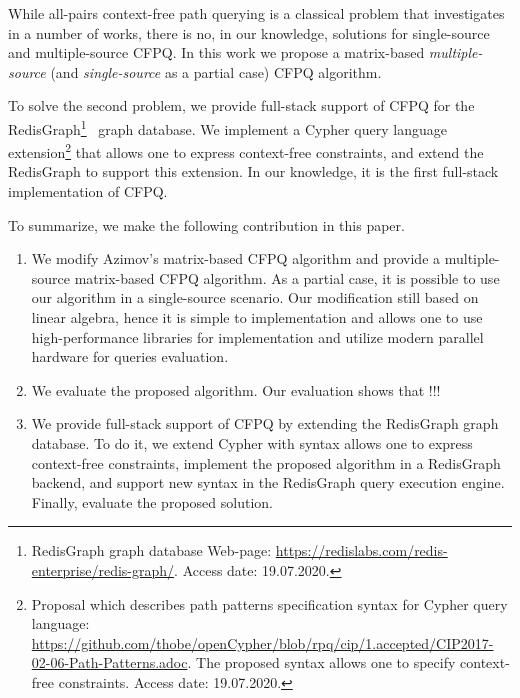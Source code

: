 While all-pairs context-free path querying is a classical problem that investigates in a number of works, there is no, in our knowledge, solutions for single-source and multiple-source CFPQ.
In this work we propose a matrix-based \textit{multiple-source} (and \textit{single-source} as a partial case) CFPQ algorithm.

To solve the second problem, we provide full-stack support of CFPQ for the RedisGraph\footnote{RedisGraph graph database Web-page: \url{https://redislabs.com/redis-enterprise/redis-graph/}. Access date: 19.07.2020.}~\cite{8778293} graph database.
We implement a Cypher query language extension\footnote{Proposal which describes path patterns specification syntax for Cypher query language: \url{https://github.com/thobe/openCypher/blob/rpq/cip/1.accepted/CIP2017-02-06-Path-Patterns.adoc}. The proposed syntax allows one to specify context-free constraints. Access date: 19.07.2020.} that allows one to express context-free constraints, and extend the RedisGraph to support this extension.
In our knowledge, it is the first full-stack implementation of CFPQ.

To summarize, we make the following contribution in this paper.
\begin{enumerate}
	\item We modify Azimov's matrix-based CFPQ algorithm and provide a multiple-source matrix-based CFPQ algorithm.
	As a partial case, it is possible to use our algorithm in a single-source scenario.
	Our modification still based on linear algebra, hence it is simple to implementation and allows one to use high-performance libraries for implementation and utilize modern parallel hardware for queries evaluation. 
	\item We evaluate the proposed algorithm.
	Our evaluation shows that !!!
	\item We provide full-stack support of CFPQ by extending the RedisGraph graph database.
	To do it, we extend Cypher with syntax allows one to express context-free constraints, implement the proposed algorithm in a RedisGraph backend, and support new syntax in the RedisGraph query execution engine. Finally, evaluate the proposed solution.
\end{enumerate}